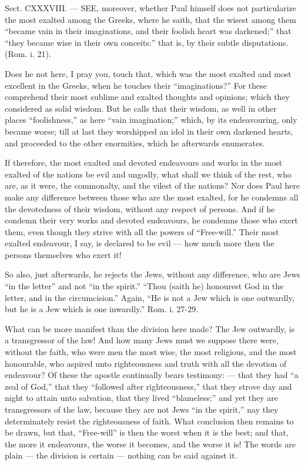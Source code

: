 
Sect. CXXXVIII. — SEE, moreover, whether Paul himself does not particularize the most exalted among the Greeks, where he saith, that the wisest among them “became vain in their imaginations, and their foolish heart was darkened;” that “they became wise in their own conceits:” that is, by their subtle disputations. (Rom. i. 21).

Does he not here, I pray you, touch that, which was the most exalted and most excellent in the Greeks, when he touches their “imaginations?” For these comprehend their most sublime and exalted thoughts and opinions; which they considered as solid wisdom. But he calls that their wisdom, as well in other places “foolishness,” as here “vain imagination;” which, by its endeavouring, only became worse; till at last they worshipped an idol in their own darkened hearts, and proceeded to the other enormities, which he afterwards enumerates.

If therefore, the most exalted and devoted endeavours and works in the most exalted of the nations be evil and ungodly, what shall we think of the rest, who are, as it were, the commonalty, and the vilest of the nations? Nor does Paul here make any difference between those who are the most exalted, for he condemns all the devotedness of their wisdom, without any respect of persons. And if he condemn their very works and devoted endeavours, he condemns those who exert them, even though they strive with all the powers of “Free-will.” Their most exalted endeavour, I say, is declared to be evil — how much more then the persons themselves who exert it!

So also, just afterwards, he rejects the Jews, without any difference, who are Jews “in the letter” and not “in the spirit.” “Thou (saith he) honourest God in the letter, and in the circumcision.” Again, “He is not a Jew which is one outwardly, but he is a Jew which is one inwardly.” Rom. i. 27-29.

What can be more manifest than the division here made? The Jew outwardly, is a transgressor of the law! And how many Jews must we suppose there were, without the faith, who were men the most wise, the most religious, and the most honourable, who aspired unto righteousness and truth with all the devotion of endeavour? Of these the apostle continually bears testimony: — that they had “a zeal of God,” that they “followed after righteousness,” that they strove day and night to attain unto salvation, that they lived “blameless:” and yet they are transgressors of the law, because they are not Jews “in the spirit,” nay they determinately resist the righteousness of faith. What conclusion then remains to be drawn, but that, “Free-will” is then the worst when it is the best; and that, the more it endeavours, the worse it becomes, and the worse it is! The words are plain — the division is certain — nothing can be said against it.

